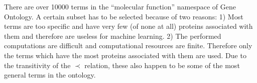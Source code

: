 \documentclass[11pt,twoside,a4paper]{book}
\begin{document}
There are over 10000 terms in the ``molecular function'' namespace of Gene Ontology.
A certain subset has to be selected because of two reasons:
1) Most terms are too specific and have very few (of none at all) proteins associated with them
and therefore are useless for machine learning.
2) The performed computations are difficult and computational resources are finite.
Therefore only the terms which have the most proteins associated with them are used.
Due to the transitivity of the $\prec$ relation,
these also happen to be some of the most general terms in the ontology.                                                                                                                                                                                                                                                                                                                                                                                                                                                                                                                                                                                                                                                                                                                                                                                                                                                                                                                                                                                         
                                                                                                                                                                                                                                                                                                                                                                                                                                                                                                                                                                                                                                                                                                                                               
\end{document}
